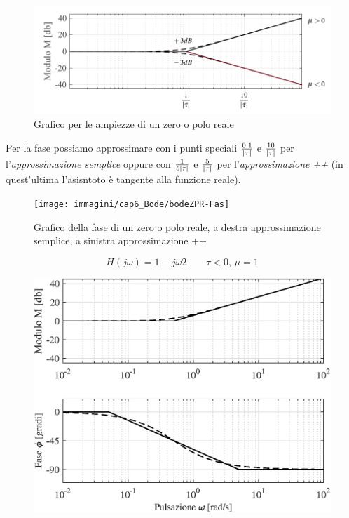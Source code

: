 \begin{figure}[H]
	\centering
	\includegraphics[width=0.7\linewidth]{immagini/cap6_Bode/bodeZPR-Amp}
	\caption{Grafico per le ampiezze di un zero o polo reale}
	\label{fig:bodezpr-amp}
\end{figure}

Per la fase possiamo approssimare con i punti speciali $ \frac{0.1}{\lvert\tau\rvert} $ e $ \frac{10}{\lvert\tau\rvert} $ per l'\emph{approssimazione semplice} oppure con $ \frac{1}{5\lvert\tau\rvert} $ e $ \frac{5}{\lvert\tau\rvert} $ per l'\emph{approssimazione ++} (in quest'ultima l'asisntoto è tangente alla funzione reale).

\begin{figure}[H]
	\centering
	\texttt{[image: immagini/cap6\_Bode/bodeZPR-Fas]}
	\caption{Grafico della fase di un zero o polo reale, a destra approssimazione semplice, a sinistra approssimazione ++}
	\label{fig:bodezpr-fas}
\end{figure}

\begin{nexample}
	\[ H(j\omega) = 1-j\omega2 \qquad\tau<0, \, \mu = 1 \]
\begin{figure}[H]
	\centering
	\includegraphics[width=0.7\linewidth]{immagini/cap6_Bode/es3}
	\label{fig:Bode_es3}
\end{figure}	
\end{nexample}

